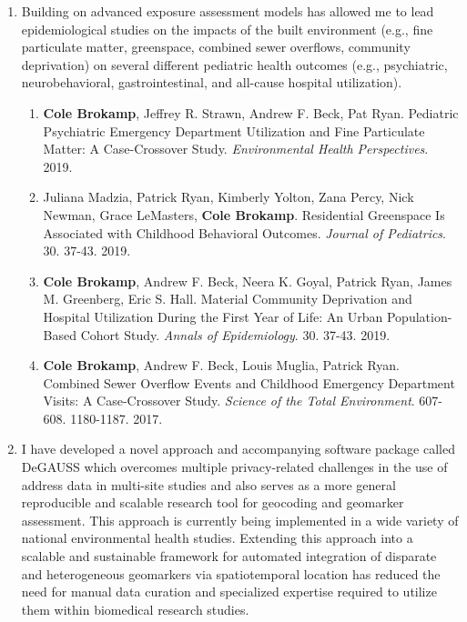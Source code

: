 \documentclass{nihbiosketch}
\begin{document}
\begin{enumerate}
\begin{enumerate}
\end{enumerate}

\item Building on advanced exposure assessment models has allowed me to lead epidemiological studies on the impacts of the built environment (e.g., fine particulate matter, greenspace, combined sewer overflows, community deprivation) on several different pediatric health outcomes (e.g., psychiatric, neurobehavioral, gastrointestinal, and all-cause hospital utilization).

  \begin{enumerate}

  \item \textbf{Cole Brokamp}, Jeffrey R. Strawn, Andrew F. Beck, Pat Ryan.
    Pediatric Psychiatric Emergency Department Utilization and Fine
    Particulate Matter: A Case-Crossover Study. \textit{Environmental Health
      Perspectives}. 2019.

  \item Juliana Madzia, Patrick Ryan, Kimberly Yolton, Zana Percy, Nick Newman, Grace
    LeMasters, \textbf{Cole Brokamp}. Residential Greenspace Is Associated with Childhood
    Behavioral Outcomes. \textit{Journal of Pediatrics}. 30. 37-43. 2019.

  \item \textbf{Cole Brokamp}, Andrew F. Beck, Neera K. Goyal, Patrick Ryan,
    James M. Greenberg, Eric S. Hall. Material Community Deprivation and
    Hospital Utilization During the First Year of Life: An Urban
    Population-Based Cohort Study. \textit{Annals of Epidemiology}. 30. 37-43.
    2019.

  \item \textbf{Cole Brokamp}, Andrew F. Beck, Louis Muglia, Patrick Ryan. Combined Sewer Overflow Events and Childhood Emergency Department Visits: A Case-Crossover Study. \textit{Science of the Total Environment}. 607-608. 1180-1187. 2017.
    
  \end{enumerate}

\item I have developed a novel approach and accompanying software package called DeGAUSS
  which overcomes multiple privacy-related challenges in the use of address data in
  multi-site studies and also serves as a more general reproducible and scalable
  research tool for geocoding and geomarker assessment. This approach is currently being
  implemented in a wide variety of national environmental health studies. Extending this
  approach into a scalable and sustainable framework for automated integration of
  disparate and heterogeneous geomarkers via spatiotemporal location has reduced
  the need for manual data curation and specialized expertise required
  to utilize them within biomedical research studies.


\end{enumerate}
\end{document}
